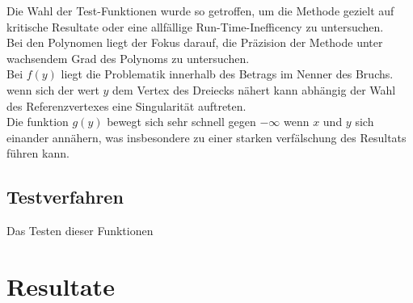 \documentclass[12pt]{article}
\begin{document}
Die Wahl der Test-Funktionen wurde so getroffen, um die Methode gezielt auf kritische Resultate oder eine allfällige Run-Time-Inefficency zu untersuchen.\\
Bei den Polynomen liegt der Fokus darauf, die Präzision der Methode unter wachsendem Grad des Polynoms zu untersuchen.
\\
Bei $f(y)$ liegt die Problematik innerhalb des Betrags im Nenner des Bruchs. wenn sich der wert $y$ dem Vertex des Dreiecks nähert kann abhängig der Wahl des Referenzvertexes eine Singularität auftreten.\\
Die funktion $g(y)$ bewegt sich sehr schnell gegen $-\infty$ wenn $x$ und $y$ sich einander annähern, was insbesondere zu einer starken verfälschung des Resultats führen kann.\\


\subsection{Testverfahren}

Das Testen dieser Funktionen


\newpage

\section{Resultate}

\newpage
\end{document}
